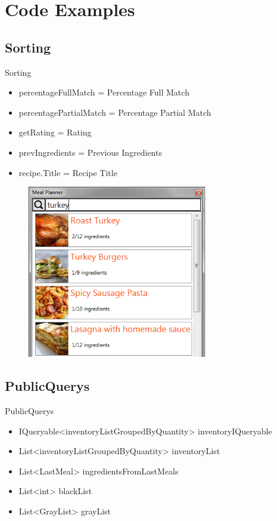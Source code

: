 \section{Code Examples}

\subsection{Sorting}
\begin{frame}{Sorting}
    \begin{itemize}
        \item percentageFullMatch = Percentage Full Match
        \item percentagePartialMatch = Percentage Partial Match
        \item getRating = Rating
        \item prevIngredients = Previous Ingredients
        \item recipe.Title = Recipe Title
    \end{itemize}
    \begin{figure}
        \centering
        \includegraphics[width=0.7\textwidth]{graphics/recipe-search-item}
    \end{figure}

\end{frame}

\subsection{PublicQuerys}
\begin{frame}{PublicQuerys}
    \begin{itemize}
        \item IQueryable<inventoryListGroupedByQuantity> inventoryIQueryable
        \item List<inventoryListGroupedByQuantity> inventoryList
        \item List<LastMeal> ingredientsFromLastMeals
        \item List<int> blackList
        \item List<GrayList> grayList
    \end{itemize}
\end{frame}

